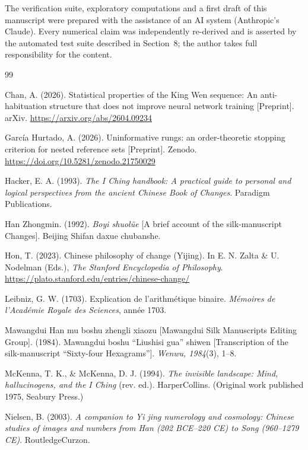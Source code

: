 \documentclass[11pt]{article}
\begin{document}
The verification suite, exploratory computations and a first draft of this manuscript were prepared with the assistance of an AI system (Anthropic's Claude). Every numerical claim was independently re-derived and is asserted by the automated test suite described in Section~8; the author takes full responsibility for the content.

\begin{thebibliography}{99}

 Chan, A. (2026). Statistical properties of the King Wen sequence: An anti-habituation structure that does not improve neural network training [Preprint]. arXiv. \url{https://arxiv.org/abs/2604.09234}

 García Hurtado, A. (2026). Uninformative rungs: an order-theoretic stopping criterion for nested reference sets [Preprint]. Zenodo. \url{https://doi.org/10.5281/zenodo.21750029}

 Hacker, E. A. (1993). \textit{The I Ching handbook: A practical guide to personal and logical perspectives from the ancient Chinese Book of Changes}. Paradigm Publications.

 Han Zhongmin. (1992). \textit{Boyi shuolüe} [A brief account of the silk-manuscript Changes]. Beijing Shifan daxue chubanshe.

 Hon, T. (2023). Chinese philosophy of change (Yijing). In E. N. Zalta \& U. Nodelman (Eds.), \textit{The Stanford Encyclopedia of Philosophy}. \url{https://plato.stanford.edu/entries/chinese-change/}

 Leibniz, G. W. (1703). Explication de l'arithmétique binaire. \textit{Mémoires de l'Académie Royale des Sciences}, année 1703.

 Mawangdui Han mu boshu zhengli xiaozu [Mawangdui Silk Manuscripts Editing Group]. (1984). Mawangdui boshu ``Liushisi gua'' shiwen [Transcription of the silk-manuscript ``Sixty-four Hexagrams'']. \textit{Wenwu, 1984}(3), 1--8.

 McKenna, T. K., \& McKenna, D. J. (1994). \textit{The invisible landscape: Mind, hallucinogens, and the I Ching} (rev. ed.). HarperCollins. (Original work published 1975, Seabury Press.)

 Nielsen, B. (2003). \textit{A companion to Yi jing numerology and cosmology: Chinese studies of images and numbers from Han (202 BCE--220 CE) to Song (960--1279 CE)}. RoutledgeCurzon.


\end{thebibliography}
\end{document}

